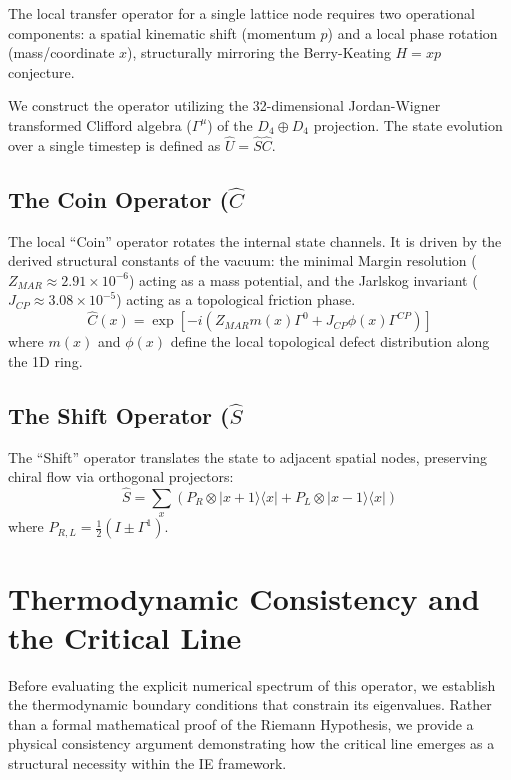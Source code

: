 \documentclass[11pt,aps,prd,twocolumn,nofootinbib,superscriptaddress]{revtex4-2}
\begin{document}
The local transfer operator for a single lattice node requires two operational components: a spatial kinematic shift (momentum $p$) and a local phase rotation (mass/coordinate $x$), structurally mirroring the Berry-Keating $H = xp$ conjecture.

We construct the operator utilizing the 32-dimensional Jordan-Wigner transformed Clifford algebra ($\Gamma^\mu$) of the $D_4 \oplus D_4$ projection. The state evolution over a single timestep is defined as $\hat{U} = \hat{S} \hat{C}$.

\subsection{The Coin Operator (\texorpdfstring{$\hat{C}$})}
The local ``Coin'' operator rotates the internal state channels. It is driven by the derived structural constants of the vacuum: the minimal Margin resolution ($Z_{MAR} \approx 2.91 \times 10^{-6}$) acting as a mass potential, and the Jarlskog invariant ($J_{CP} \approx 3.08 \times 10^{-5}$) acting as a topological friction phase.
\begin{equation}
    \hat{C}(x) = \exp[-i \left( Z_{MAR} m(x) \Gamma^0 + J_{CP} \phi(x) \Gamma^{CP} \right)]
\end{equation}
where $m(x)$ and $\phi(x)$ define the local topological defect distribution along the 1D ring.

\subsection{The Shift Operator (\texorpdfstring{$\hat{S}$})}
The ``Shift'' operator translates the state to adjacent spatial nodes, preserving chiral flow via orthogonal projectors:
\begin{equation}
    \hat{S} = \sum_x \left( P_R \otimes |x+1\rangle\langle x| + P_L \otimes |x-1\rangle\langle x| \right)
\end{equation}
where $P_{R,L} = \frac{1}{2}(I \pm \Gamma^1)$.

\section{Thermodynamic Consistency and the Critical Line}

Before evaluating the explicit numerical spectrum of this operator, we establish the thermodynamic boundary conditions that constrain its eigenvalues. Rather than a formal mathematical proof of the Riemann Hypothesis, we provide a physical consistency argument demonstrating how the critical line emerges as a structural necessity within the IE framework.
\end{document}
